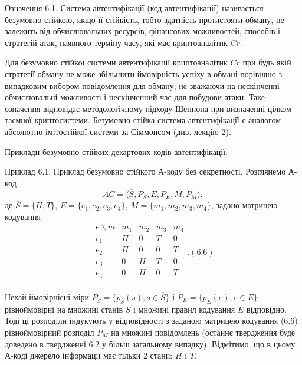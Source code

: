 \begin{definition}
    Означення 6.1. Система автентифікації (код автентифікації) називається
    безумовно стійкою, якщо її стійкість, тобто здатність протистояти обману, не
    залежить від обчислювальних ресурсів, фінансових можливостей, способів і
    стратегій атак, наявного терміну часу, які має криптоаналітик $Cr$.
\end{definition}

Для безумовно стійкої системи автентифікації криптоаналітик $Cr$ при будь якій
стратегії обману не може збільшити ймовірність успіху в обмані
порівняно з випадковим вибором повідомлення для обману, не зважаючи
на нескінченні обчислювальні можливості і нескінченний час для побудови
атаки. Таке означення відповідає методологічному підходу Шеннона при
визначенні цілком таємної криптосистеми. Безумовно стійка система
автентифікації є аналогом абсолютно імітостійкої системи за Сіммонсом
(див. лекцію 2).

Приклади безумовно стійких декартових кодів автентифікації.

\begin{example}
    
\end{example}
Приклад 6.1. Приклад безумовно стійкого А-коду без секретності.
Розглянемо А-код
\begin{equation*}
    AC = \langle \overline{S}, P_{\overline{S}}, E, P_E, M, P_M \rangle,
\end{equation*}
де $\overline{S} = \{H, T\}$, $E = \{e_1, e_2, e_3, e_4\}$, $M = \{m_1, m_2, m_3, m_4\}$, задано матрицею
кодування
\begin{equation}
    \begin{matrix}
        e \backslash m & m_1 & m_2 & m_3 & m_4 \\ 
        e_1 & H & 0 & T & 0 \\ 
        e_2 & H & 0 & 0 & T \\ 
        e_3 & 0 & H & T & 0 \\ 
        e_4 & 0 & H & 0 & T \\ 
    \end{matrix}. (6.6)
\end{equation}

Нехай ймовірнісні міри $P_{\overline{S}} = \{p_{\overline{S}}(s), s \in \overline{S}\}$ і $P_E = \{p_E(e), e \in E\}$ рівноймовірні
на множині станів $\overline{S}$ і множині правил кодування $E$ відповідно. Тоді ці розподіли
індукують у відповідності з заданою матрицею кодування (6.6) рівноймовірний
розподіл $P_M$ на множині повідомлень (останнє твердження буде доведено в
твердженні 6.2 у більш загальному випадку). Відмітимо, що в цьому А-коді
джерело інформації має тільки 2 стани: $H$ і $T$.

